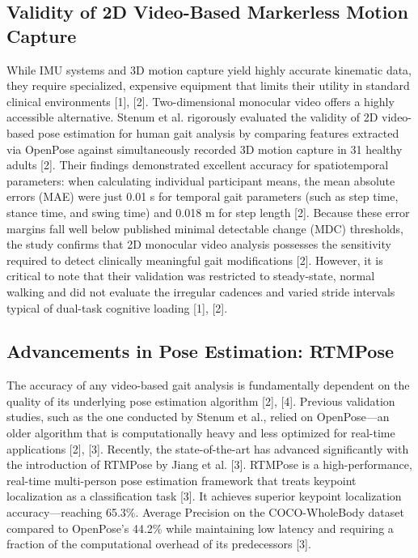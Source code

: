 \documentclass[conference]{IEEEtran}
\begin{document}
\subsection{Validity of 2D Video-Based Markerless Motion Capture}
While IMU systems and 3D motion capture yield highly accurate kinematic data, they require specialized, expensive equipment that limits their utility in standard clinical environments [1], [2]. Two-dimensional monocular video offers a highly accessible alternative. Stenum et al. rigorously evaluated the validity of 2D video-based pose estimation for human gait analysis by comparing features extracted via OpenPose against simultaneously recorded 3D motion capture in 31 healthy adults [2]. Their findings demonstrated excellent accuracy for spatiotemporal parameters: when calculating individual participant means, the mean absolute errors (MAE) were just 0.01 s for temporal gait parameters (such as step time, stance time, and swing time) and 0.018 m for step length [2]. Because these error margins fall well below published minimal detectable change (MDC) thresholds, the study confirms that 2D monocular video analysis possesses the sensitivity required to detect clinically meaningful gait modifications [2]. However, it is critical to note that their validation was restricted to steady-state, normal walking and did not evaluate the irregular cadences and varied stride intervals typical of dual-task cognitive loading [1], [2].

\subsection{Advancements in Pose Estimation: RTMPose}
The accuracy of any video-based gait analysis is fundamentally dependent on the quality of its underlying pose estimation algorithm [2], [4]. Previous validation studies, such as the one conducted by Stenum et al., relied on OpenPose—an older algorithm that is computationally heavy and less optimized for real-time applications [2], [3]. Recently, the state-of-the-art has advanced significantly with the introduction of RTMPose by Jiang et al. [3]. RTMPose is a high-performance, real-time multi-person pose estimation framework that treats keypoint localization as a classification task [3]. It achieves superior keypoint localization accuracy—reaching 65.3\%. Average Precision on the COCO-WholeBody dataset compared to OpenPose's 44.2\% while maintaining low latency and requiring a fraction of the computational overhead of its predecessors [3].
\end{document}
